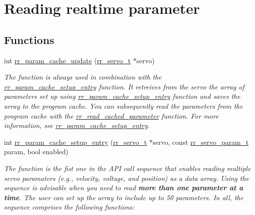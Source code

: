 \hypertarget{group___realtime}{}\section{Reading realtime parameter}
\label{group___realtime}
\subsection*{Functions}
\begin{DoxyCompactItemize}
\item 
int \hyperlink{group___realtime_ga4d9f2bcfc136357405359c9ca9d4aedf}{rr\+\_\+param\+\_\+cache\+\_\+update} (\hyperlink{structrr__servo__t}{rr\+\_\+servo\+\_\+t} $\ast$servo)
\begin{DoxyCompactList}\small\item\em The function is always used in combination with the \hyperlink{group___realtime_ga770c1e8b4d868cea649592e26a2706dd}{rr\+\_\+param\+\_\+cache\+\_\+setup\+\_\+entry} function. It retreives from the servo the array of parameters set up using \hyperlink{group___realtime_ga770c1e8b4d868cea649592e26a2706dd}{rr\+\_\+param\+\_\+cache\+\_\+setup\+\_\+entry} function and saves the array to the program cache. You can subsequently read the parameters from the program cache with the \hyperlink{group___realtime_ga9249202a29031f84b7dc3da37db05dfc}{rr\+\_\+read\+\_\+cached\+\_\+parameter} function. For more information, see \hyperlink{group___realtime_ga770c1e8b4d868cea649592e26a2706dd}{rr\+\_\+param\+\_\+cache\+\_\+setup\+\_\+entry}. \end{DoxyCompactList}\item 
int \hyperlink{group___realtime_ga770c1e8b4d868cea649592e26a2706dd}{rr\+\_\+param\+\_\+cache\+\_\+setup\+\_\+entry} (\hyperlink{structrr__servo__t}{rr\+\_\+servo\+\_\+t} $\ast$servo, const \hyperlink{api_8h_aa1f58887fab4642cf49f6f453c1d276d}{rr\+\_\+servo\+\_\+param\+\_\+t} param, bool enabled)
\begin{DoxyCompactList}\small\item\em The function is the fist one in the A\+PI call sequence that enables reading multiple servo paramaters (e.\+g., velocity, voltage, and position) as a data array. Using the sequence is advisable when you need to read {\bfseries more than one parameter at a time}. The user can set up the array to include up to 50 parameters. In all, the sequence comprises the following functions\+: \end{DoxyCompactList}\item 

\end{DoxyCompactItemize}
